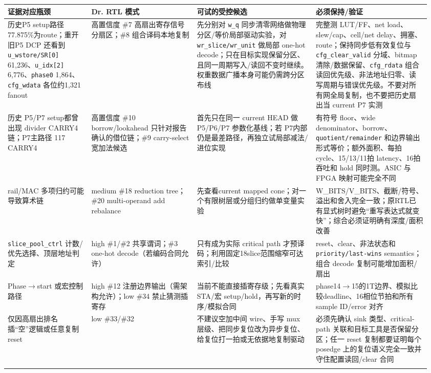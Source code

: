 \documentclass[UTF8,fontset=fandol,10pt,a4paper,openany]{ctexrep}
\newcommand{\code}[1]{\nolinkurl{#1}}
\begin{document}
\begingroup\small\setlength{\tabcolsep}{2pt}\renewcommand{\arraystretch}{1.25}\begin{longtable}{@{}>{\raggedright\arraybackslash}p{0.19\linewidth}>{\raggedright\arraybackslash}p{0.24\linewidth}>{\raggedright\arraybackslash}p{0.27\linewidth}>{\raggedright\arraybackslash}p{0.26\linewidth}@{}}
\toprule
\textbf{证据对应瓶颈} & \textbf{Dr. RTL 模式} & \textbf{可试的受控候选} & \textbf{必须保持/验证}\\\midrule\endhead
历史P5 setup路径77.875\%为route；重开旧P5 DCP 还看到 \code{u_wstore/SR[0]} 61,236、\code{u_idx[2]} 6,776、\code{phase0} 1,864、\code{cfg_wdata} 各位约1,321 fanout & 高置信度 \#7 高扇出寄存信号分扇区；\#8 组合译码本地复制 & 先分别对 \code{w_q} 同步清零网络做物理分区/等价局部驱动实验，对 \code{wr_slice/wr_unit} 做局部 one-hot decode；只在目标实现保留分区、且同一周期写入/读回不变时继续。权重数据广播本身可能仍需跨分区布线 & 完整测 LUT/FF、net load、slew/cap、cell/net delay、拥塞、route；保持同步低有效复位与 \code{cfg_clear_valid} 分域、bitmap清除/数据保留、\code{cfg_rdata} 组合读回优先级、非法地址归零、读写周期与错误优先级。不要对所有网全局复制，也不要把历史扇出当 current P7 实测\\\addlinespace[2pt]
历史 P5/P7 setup都曾出现 divider CARRY4链；P7主路径 117 CARRY4 & 高置信度 \#10 borrow/lookahead 只针对报告确认的借位链；\#9 carry-select 宽加法候选 & 首先只在同一 current HEAD 做 P5/P6/P7 参数化基线；若 P7内部仍是最差路径，再独立试局部减法/进位实现 & 有符号 floor、wide denominator、borrow、\code{quotient/remainder} 和边界输出形式等价；额外面积、每拍 cycle、15/13/11拍 latency、16拍吞吐和 hold 同时测。ASIC 与 FPGA 映射可能完全不同\\\addlinespace[2pt]
rail/MAC 多项归约可能导致算术链 & medium \#18 reduction tree；\#20 multi-operand add rebalance & 先查看current mapped cone；对一个有限树层或分组归约做单变量实验 & W\_BITS/V\_BITS、截断/符号、溢出和舍入完全一致；原RTL已有显式树时避免“重写表达式就变快”；综合必须证明确有深度/面积改善\\\addlinespace[2pt]
\code{slice_pool_ctrl} 计数/优先选择、顶层地址判定 & high \#1/\#2 共享谓词；\#3 one-hot decode（若编码合同允许） & 只有成为实际 critical path 才预译码；利用固定18slice范围缩窄可达索引/比较 & reset、clear、非法状态和 \code{priority/last-wins} semantics；组合 decode 复制可能增加面积/扇出\\\addlinespace[2pt]
Phase\ensuremath{\rightarrow}start 或宏控制路径 & high \#12 注册边界输出（需架构允许）；low \#34 禁止猜测插寄存 & 当前不能直接插寄存级；先看真实 STA/宏 setup/hold，再写新的时序/模拟合同 & phase14\ensuremath{\rightarrow}15的1T边界、模拟比较deadline、16相位节拍和所有 sample ID/error 对齐\\\addlinespace[2pt]
仅因高扇出排名插“空”逻辑或任意复制 reset & low \#33/\#32 & 不建议空加中间 wire、手写 mux 层级、把同步复位改为异步复位、给复位打一拍或无依据地复制驱动 & 必须先确认 sink 类型、critical-path 关联和目标工具是否保留分区；任一 reset 复制都要证明每个 posedge 上的复位语义完全一致并守住配置读回/clear 合同\\\addlinespace[2pt]
\bottomrule\end{longtable}\endgroup
\end{document}
